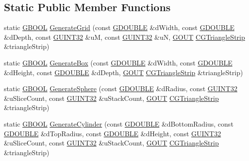 \subsection*{Static Public Member Functions}
\begin{DoxyCompactItemize}
\item 
static \hyperlink{_g_types_8h_a2901915743626352a6820c5405f556dc}{G\+B\+O\+O\+L} \hyperlink{class_c_g_geometry_generator_a7c26b57b9d302715f188558cc5b6bf9f}{Generate\+Grid} (const \hyperlink{_g_types_8h_afd05ac85f90ee8e2a733928545462cd4}{G\+D\+O\+U\+B\+L\+E} \&d\+Width, const \hyperlink{_g_types_8h_afd05ac85f90ee8e2a733928545462cd4}{G\+D\+O\+U\+B\+L\+E} \&d\+Depth, const \hyperlink{_g_types_8h_a2e1a1c77d1349057202e2f34e071019c}{G\+U\+I\+N\+T32} \&u\+M, const \hyperlink{_g_types_8h_a2e1a1c77d1349057202e2f34e071019c}{G\+U\+I\+N\+T32} \&u\+N, \hyperlink{_g_types_8h_a0858ec221262e635612871d70ca233ad}{G\+O\+U\+T} \hyperlink{class_c_g_triangle_strip}{C\+G\+Triangle\+Strip} \&triangle\+Strip)
\item 
static \hyperlink{_g_types_8h_a2901915743626352a6820c5405f556dc}{G\+B\+O\+O\+L} \hyperlink{class_c_g_geometry_generator_a614212df30df365d8da2c036fb972961}{Generate\+Box} (const \hyperlink{_g_types_8h_afd05ac85f90ee8e2a733928545462cd4}{G\+D\+O\+U\+B\+L\+E} \&d\+Width, const \hyperlink{_g_types_8h_afd05ac85f90ee8e2a733928545462cd4}{G\+D\+O\+U\+B\+L\+E} \&d\+Height, const \hyperlink{_g_types_8h_afd05ac85f90ee8e2a733928545462cd4}{G\+D\+O\+U\+B\+L\+E} \&d\+Depth, \hyperlink{_g_types_8h_a0858ec221262e635612871d70ca233ad}{G\+O\+U\+T} \hyperlink{class_c_g_triangle_strip}{C\+G\+Triangle\+Strip} \&triangle\+Strip)
\item 
static \hyperlink{_g_types_8h_a2901915743626352a6820c5405f556dc}{G\+B\+O\+O\+L} \hyperlink{class_c_g_geometry_generator_a43dab8b30599095401c02daa97f8b0b5}{Generate\+Sphere} (const \hyperlink{_g_types_8h_afd05ac85f90ee8e2a733928545462cd4}{G\+D\+O\+U\+B\+L\+E} \&d\+Radius, const \hyperlink{_g_types_8h_a2e1a1c77d1349057202e2f34e071019c}{G\+U\+I\+N\+T32} \&u\+Slice\+Count, const \hyperlink{_g_types_8h_a2e1a1c77d1349057202e2f34e071019c}{G\+U\+I\+N\+T32} \&u\+Stack\+Count, \hyperlink{_g_types_8h_a0858ec221262e635612871d70ca233ad}{G\+O\+U\+T} \hyperlink{class_c_g_triangle_strip}{C\+G\+Triangle\+Strip} \&triangle\+Strip)
\item 
static \hyperlink{_g_types_8h_a2901915743626352a6820c5405f556dc}{G\+B\+O\+O\+L} \hyperlink{class_c_g_geometry_generator_a3eb461a3ef0bf6cd3fca4eca37461b5d}{Generate\+Cylinder} (const \hyperlink{_g_types_8h_afd05ac85f90ee8e2a733928545462cd4}{G\+D\+O\+U\+B\+L\+E} \&d\+Bottom\+Radius, const \hyperlink{_g_types_8h_afd05ac85f90ee8e2a733928545462cd4}{G\+D\+O\+U\+B\+L\+E} \&d\+Top\+Radius, const \hyperlink{_g_types_8h_afd05ac85f90ee8e2a733928545462cd4}{G\+D\+O\+U\+B\+L\+E} \&d\+Height, const \hyperlink{_g_types_8h_a2e1a1c77d1349057202e2f34e071019c}{G\+U\+I\+N\+T32} \&u\+Slice\+Count, const \hyperlink{_g_types_8h_a2e1a1c77d1349057202e2f34e071019c}{G\+U\+I\+N\+T32} \&u\+Stack\+Count, \hyperlink{_g_types_8h_a0858ec221262e635612871d70ca233ad}{G\+O\+U\+T} \hyperlink{class_c_g_triangle_strip}{C\+G\+Triangle\+Strip} \&triangle\+Strip)

\end{DoxyCompactItemize}
